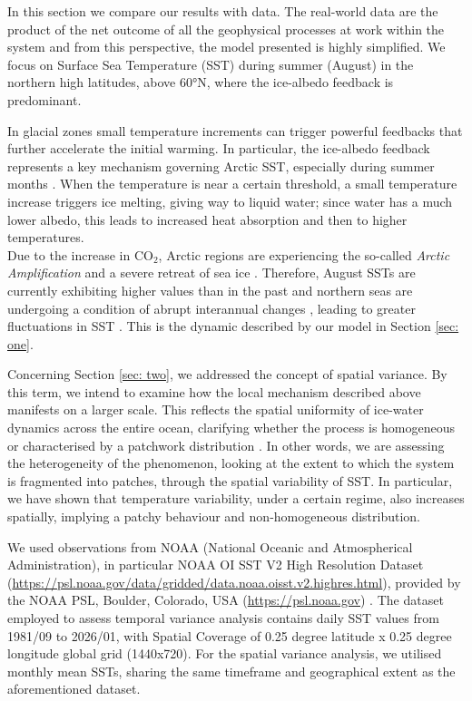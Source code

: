 \documentclass[10pt]{amsart}
\numberwithin{equation}{section}
\begin{document}
In this section we compare our results with data. The real-world data are the product of the net outcome of all the geophysical processes at work within the system and from this perspective, the model presented is highly simplified. We focus on Surface Sea Temperature (SST) during summer (August) in the northern high latitudes, above 60°N, where the ice-albedo feedback is predominant. 

In glacial zones small temperature increments can trigger powerful feedbacks that further accelerate the initial warming. In particular, the ice-albedo feedback represents a key mechanism governing Arctic SST, especially during summer months \cite{NOAA_SST_23}.  
When the temperature is near a certain threshold, a small temperature increase triggers ice melting, giving way to liquid water; since water has a much lower albedo, this leads to increased heat absorption and then to higher temperatures. \\
Due to the increase in $\mathrm{CO}_2$, Arctic regions are experiencing the so-called \textit{Arctic Amplification} 
\cite{Serreze} and a severe retreat of sea ice 
\cite{Goosse2009}. Therefore, August SSTs are currently exhibiting higher values than in the past 
\cite{CarvalhoWang2020} 
and northern seas are undergoing a condition of abrupt interannual changes \cite{LandrumHolland2020}
, leading to greater fluctuations in SST \cite{NOAA_SST_23,Alexander2018}. This is the dynamic described by our model in Section \ref{sec: one}.

Concerning Section \ref{sec: two}, we addressed the concept of spatial variance. By this term, we intend to examine how the local mechanism described above manifests on a larger scale. This reflects the spatial uniformity of ice-water dynamics across the entire ocean, clarifying whether the process is homogeneous or characterised by a patchwork distribution \cite{Barber2009,StrongRigor2013,Timmermans2015}. In other words, we are assessing the heterogeneity of the phenomenon, looking at the extent to which the system is fragmented into patches, through the spatial variability of SST. In particular, we have shown that temperature variability, under a certain regime, also increases spatially, implying a patchy behaviour and non-homogeneous distribution.

We used observations from NOAA (National Oceanic and Atmospherical Administration), in particular NOAA OI SST V2 High Resolution Dataset (\url{https://psl.noaa.gov/data/gridded/data.noaa.oisst.v2.highres.html}), provided by the NOAA PSL, Boulder, Colorado, USA (\url{https://psl.noaa.gov}) \cite{Huang2021}. The dataset employed to assess temporal variance analysis contains daily SST values from 1981/09 to 2026/01, with Spatial Coverage of 0.25 degree latitude x 0.25 degree longitude global grid (1440x720). For the spatial variance analysis, we utilised monthly mean SSTs, sharing the same timeframe and geographical extent as the aforementioned dataset.
\end{document}
